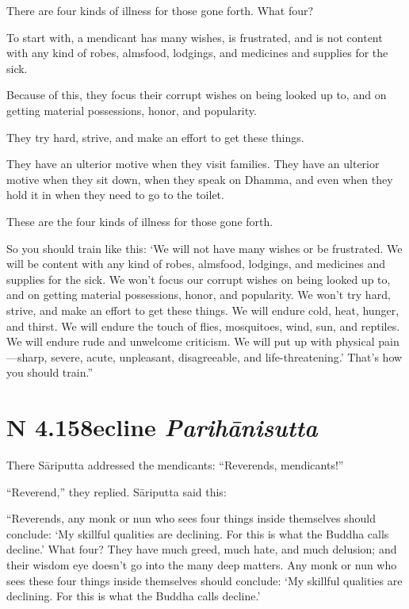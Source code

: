 \documentclass[12pt,openany]{book}%
\newcommand*{\suttatitleacronym}[1]{\smaller[2]{#1}\vspace*{.3em}}
\newcommand*{\suttatitletranslation}[1]{\linebreak{#1}}
\newcommand*{\suttatitleroot}[1]{\linebreak\smaller[2]\itshape{#1}}
\newcommand*{\tocacronym}[1]{\hspace*{-3.3em}{#1}\quad}
\newcommand*{\toctranslation}[1]{#1}
\newcommand*{\tocroot}[1]{(\textit{#1})}
\begin{document}
There are four kinds of illness for those gone forth. What four? 

To start with, a mendicant has many wishes, is frustrated, and is not content with any kind of robes, almsfood, lodgings, and medicines and supplies for the sick. 

Because of this, they focus their corrupt wishes on being looked up to, and on getting material possessions, honor, and popularity. 

They try hard, strive, and make an effort to get these things. 

They have an ulterior motive when they visit families. They have an ulterior motive when they sit down, when they speak on Dhamma, and even when they hold it in when they need to go to the toilet. 

These are the four kinds of illness for those gone forth. 

So you should train like this: ‘We will not have many wishes or be frustrated. We will be content with any kind of robes, almsfood, lodgings, and medicines and supplies for the sick. We won’t focus our corrupt wishes on being looked up to, and on getting material possessions, honor, and popularity. We won’t try hard, strive, and make an effort to get these things. We will endure cold, heat, hunger, and thirst. We will endure the touch of flies, mosquitoes, wind, sun, and reptiles. We will endure rude and unwelcome criticism. We will put up with physical pain—sharp, severe, acute, unpleasant, disagreeable, and life-threatening.’ That’s how you should train.” 

%
\section*{{\suttatitleacronym AN 4.158}{\suttatitletranslation Decline }{\suttatitleroot Parihānisutta}}
\addcontentsline{toc}{section}{\tocacronym{AN 4.158} \toctranslation{Decline } \tocroot{Parihānisutta}}

There \textsanskrit{Sāriputta} addressed the mendicants: “Reverends, mendicants!” 

“Reverend,” they replied. \textsanskrit{Sāriputta} said this: 

“Reverends, any monk or nun who sees four things inside themselves should conclude: ‘My skillful qualities are declining. For this is what the Buddha calls decline.’ What four? They have much greed, much hate, and much delusion; and their wisdom eye doesn’t go into the many deep matters. Any monk or nun who sees these four things inside themselves should conclude: ‘My skillful qualities are declining. For this is what the Buddha calls decline.’ 
\end{document}

